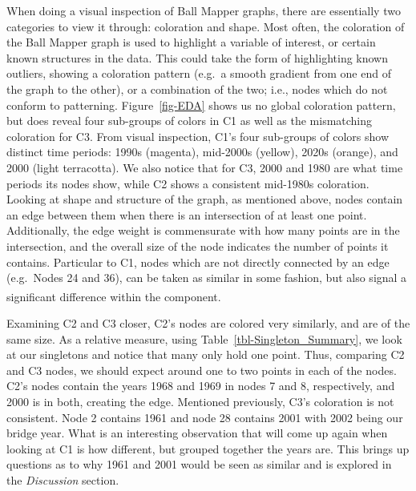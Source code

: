 \documentclass[10pt, letterpaper]{article}
\begin{document}
When doing a visual inspection of Ball Mapper graphs, there are
essentially two categories to view it through: coloration and shape.
Most often, the coloration of the Ball Mapper graph is used to highlight
a variable of interest, or certain known structures in the data. This
could take the form of highlighting known outliers, showing a coloration
pattern (e.g.~a smooth gradient from one end of the graph to the other),
or a combination of the two; i.e., nodes which do not conform to
patterning. Figure~\ref{fig-EDA} shows us no global coloration pattern,
but does reveal four sub-groups of colors in C1 as well as the
mismatching coloration for C3. From visual inspection, C1's four
sub-groups of colors show distinct time periods: 1990s (magenta),
mid-2000s (yellow), 2020s (orange), and 2000 (light terracotta). We also
notice that for C3, 2000 and 1980 are what time periods its nodes show,
while C2 shows a consistent mid-1980s coloration. Looking at shape and
structure of the graph, as mentioned above, nodes contain an edge
between them when there is an intersection of at least one point.
Additionally, the edge weight is commensurate with how many points are
in the intersection, and the overall size of the node indicates the
number of points it contains. Particular to C1, nodes which are not
directly connected by an edge (e.g.~Nodes 24 and 36), can be taken as
similar in some fashion, but also signal a significant difference within
the
component.\textsuperscript{}

Examining C2 and C3 closer, C2's nodes are colored very similarly, and
are of the same size. As a relative measure, using
Table~\ref{tbl-Singleton_Summary}, we look at our singletons and notice
that many only hold one point. Thus, comparing C2 and C3 nodes, we
should expect around one to two points in each of the nodes. C2's nodes
contain the years 1968 and 1969 in nodes 7 and 8, respectively, and 2000
is in both, creating the edge. Mentioned previously, C3's coloration is
not consistent. Node 2 contains 1961 and node 28 contains 2001 with 2002
being our bridge year. What is an interesting observation that will come
up again when looking at C1 is how different, but grouped together the
years are. This brings up questions as to why 1961 and 2001 would be
seen as similar and is explored in the \emph{Discussion} section.
\end{document}
